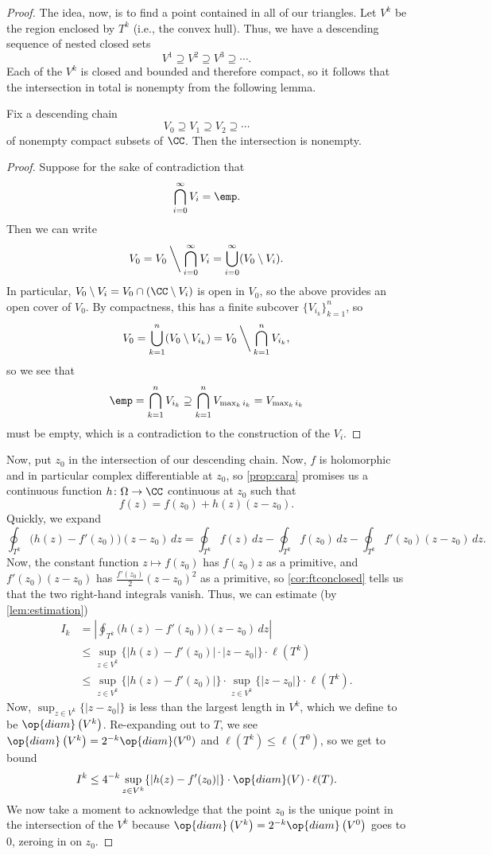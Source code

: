 \documentclass[../notes.tex]{subfiles}
\begin{document}
\begin{proof}
	The idea, now, is to find a point contained in all of our triangles. Let $V^k$ be the region enclosed by $T^k$ (i.e., the convex hull). Thus, we have a descending sequence of nested closed sets
	\[V^1\supseteq V^2\supseteq V^3\supseteq\cdots.\]
	Each of the $V^k$ is closed and bounded and therefore compact, so it follows that the intersection in total is nonempty from the following lemma.
	\begin{lemma}
		Fix a descending chain
		\[V_0\supseteq V_1\supseteq V_2\supseteq\cdots\]
		of nonempty compact subsets of $\CC$. Then the intersection is nonempty.
	\end{lemma}
	\begin{proof}
		Suppose for the sake of contradiction that
		\[\bigcap_{i=0}^\infty V_i=\emp.\]
		Then we can write
		\[V_0=V_0\mathbin{\bigg\backslash}\bigcap_{i=0}^\infty V_i=\bigcup_{i=0}^\infty(V_0\setminus V_i).\]
		In particular, $V_0\setminus V_i=V_0\cap(\CC\setminus V_i)$ is open in $V_0$, so the above provides an open cover of $V_0$. By compactness, this has a finite subcover $\{V_{i_k}\}_{k=1}^n$, so
		\[V_0=\bigcup_{k=1}^n(V_0\setminus V_{i_k})=V_0\mathbin{\bigg\backslash}\bigcap_{k=1}^nV_{i_k},\]
		so we see that
		\[\emp=\bigcap_{k=1}^nV_{i_k}\supseteq\bigcap_{k=1}^nV_{\max_ki_k}=V_{\max_ki_k}\]
		must be empty, which is a contradiction to the construction of the $V_i$.
	\end{proof}
	Now, put $z_0$ in the intersection of our descending chain. Now, $f$ is holomorphic and in particular complex differentiable at $z_0$, so \autoref{prop:cara} promises us a continuous function $h\colon \Omega\to\CC$ continuous at $z_0$ such that
	\[f(z)=f(z_0)+h(z)(z-z_0).\]
	Quickly, we expand
	\[\oint_{T^k}\big(h(z)-f'(z_0)\big)(z-z_0)\,dz=\oint_{T^k}f(z)\,dz-\oint_{T^k}f(z_0)\,dz-\oint_{T^k}f'(z_0)(z-z_0)\,dz.\]
	Now, the constant function $z\mapsto f(z_0)$ has $f(z_0)z$ as a primitive, and $f'(z_0)(z-z_0)$ has $\frac{f'(z_0)}2(z-z_0)^2$ as a primitive, so \autoref{cor:ftconclosed} tells us that the two right-hand integrals vanish. Thus, we can estimate (by \autoref{lem:estimation})
	\begin{align*}
		I_k &= \left|\oint_{T^k}\big(h(z)-f'(z_0)\big)(z-z_0)\,dz\right| \\
		&\le \sup_{z\in V^k}\{|h(z)-f'(z_0)|\cdot|z-z_0|\}\cdot\ell\left(T^k\right) \\
		&\le \sup_{z\in V^k}\{|h(z)-f'(z_0)|\} \cdot\sup_{z\in V^k}\{|z-z_0|\}\cdot\ell\left(T^k\right).
	\end{align*}
	Now, $\sup_{z\in V^k}\{|z-z_0|\}$ is less than the largest length in $V^k$, which we define to be $\op{diam}\left(V^k\right)$. Re-expanding out to $T$, we see $\op{diam}\left(V^k\right)=2^{-k}\op{diam}(V^0)$ and $\ell\left(T^k\right)\le\ell(T^0)$, so we get to bound
	\[I^k\le 4^{-k}\sup_{z\in V^k}\{|h(z)-f'(z_0)|\}\cdot\op{diam}(V)\cdot\ell(T).\]
	We now take a moment to acknowledge that the point $z_0$ is the unique point in the intersection of the $V^k$ because $\op{diam}\left(V^k\right)=2^{-k}\op{diam}\left(V^0\right)$ goes to $0$, zeroing in on $z_0$.


\end{proof}
\end{document}
